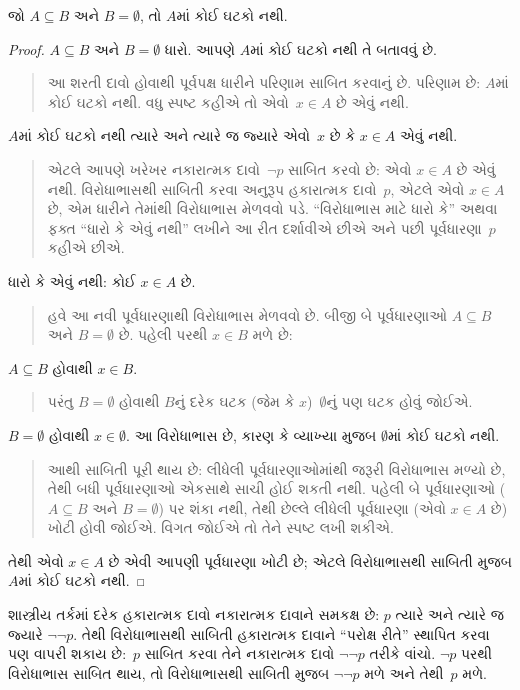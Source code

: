 \begin{prop}
  જો $A \subseteq B$ અને $B = \emptyset$, તો $A$માં કોઈ
  ઘટકો નથી.
\end{prop}

\begin{proof}
  $A \subseteq B$ અને $B = \emptyset$ ધારો. આપણે
  $A$માં કોઈ ઘટકો નથી તે બતાવવું છે.
  \begin{quote}
    આ શરતી દાવો હોવાથી પૂર્વપક્ષ ધારીને પરિણામ સાબિત
    કરવાનું છે. પરિણામ છે: $A$માં કોઈ ઘટકો નથી.
    વધુ સ્પષ્ટ કહીએ તો એવો~$x \in A$ છે એવું નથી.
  \end{quote}
  $A$માં કોઈ ઘટકો નથી ત્યારે અને ત્યારે જ જ્યારે
  એવો~$x$ છે કે $x \in A$ એવું નથી.
  \begin{quote}
    એટલે આપણે ખરેખર નકારાત્મક દાવો~$\lnot p$ સાબિત કરવો છે:
    એવો $x \in A$ છે એવું નથી. વિરોધાભાસથી સાબિતી કરવા
    અનુરૂપ હકારાત્મક દાવો~$p$, એટલે એવો $x \in A$ છે, એમ
    ધારીને તેમાંથી વિરોધાભાસ મેળવવો પડે. ``વિરોધાભાસ માટે
    ધારો કે'' અથવા ફક્ત ``ધારો કે એવું નથી'' લખીને આ રીત
    દર્શાવીએ છીએ અને પછી પૂર્વધારણા~$p$ કહીએ છીએ.
  \end{quote}
  ધારો કે એવું નથી: કોઈ $x \in A$ છે.
  \begin{quote}
    હવે આ નવી પૂર્વધારણાથી વિરોધાભાસ મેળવવો છે. બીજી બે
    પૂર્વધારણાઓ $A \subseteq B$ અને $B = \emptyset$ છે.
    પહેલી પરથી $x \in B$ મળે છે:
  \end{quote}
  $A \subseteq B$ હોવાથી $x \in B$.
  \begin{quote}
    પરંતુ $B = \emptyset$ હોવાથી $B$નું દરેક ઘટક
    (જેમ કે $x$)~$\emptyset$નું પણ ઘટક હોવું જોઈએ.
  \end{quote}
  $B = \emptyset$ હોવાથી $x \in \emptyset$. આ વિરોધાભાસ છે,
  કારણ કે વ્યાખ્યા મુજબ $\emptyset$માં કોઈ ઘટકો નથી.
  \begin{quote}
    આથી સાબિતી પૂરી થાય છે: લીધેલી પૂર્વધારણાઓમાંથી જરૂરી
    વિરોધાભાસ મળ્યો છે, તેથી બધી પૂર્વધારણાઓ એકસાથે સાચી
    હોઈ શકતી નથી. પહેલી બે પૂર્વધારણાઓ ($A \subseteq B$ અને
    $B = \emptyset$) પર શંકા નથી, તેથી છેલ્લે લીધેલી
    પૂર્વધારણા (એવો $x \in A$ છે) ખોટી હોવી જોઈએ. વિગત
    જોઈએ તો તેને સ્પષ્ટ લખી શકીએ.
  \end{quote}
  તેથી એવો $x \in A$ છે એવી આપણી પૂર્વધારણા ખોટી છે;
  એટલે વિરોધાભાસથી સાબિતી મુજબ $A$માં કોઈ ઘટકો નથી.
\end{proof}

શાસ્ત્રીય તર્કમાં દરેક હકારાત્મક દાવો નકારાત્મક દાવાને સમકક્ષ
છે: $p$ ત્યારે અને ત્યારે જ જ્યારે $\lnot\lnot p$.
 તેથી વિરોધાભાસથી સાબિતી હકારાત્મક
દાવાને ``પરોક્ષ રીતે'' સ્થાપિત કરવા પણ વાપરી શકાય છે:~$p$
સાબિત કરવા તેને નકારાત્મક દાવો $\lnot\lnot p$ તરીકે વાંચો.
$\lnot p$ પરથી વિરોધાભાસ સાબિત થાય, તો વિરોધાભાસથી સાબિતી
મુજબ $\lnot\lnot p$ મળે અને તેથી~$p$ મળે.

